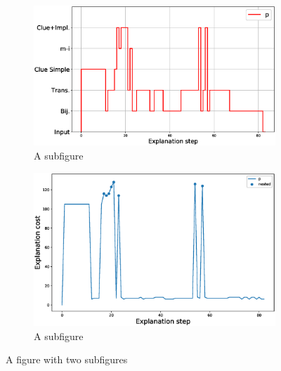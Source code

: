 \begin{figure}
\centering
\begin{subfigure}{.5\textwidth}
	\centering
	\includegraphics[width=\linewidth]{figures/plot_cost_steps_p.eps}
	\caption{A subfigure}
	\label{fig:sub1}
\end{subfigure}%
\begin{subfigure}{.5\textwidth}
	\centering
	\includegraphics[width=0.9\linewidth]{figures/P.eps}
	\caption{A subfigure}
	\label{fig:sub2}
\end{subfigure}
\caption{A figure with two subfigures}
\label{fig:test}
\end{figure}

